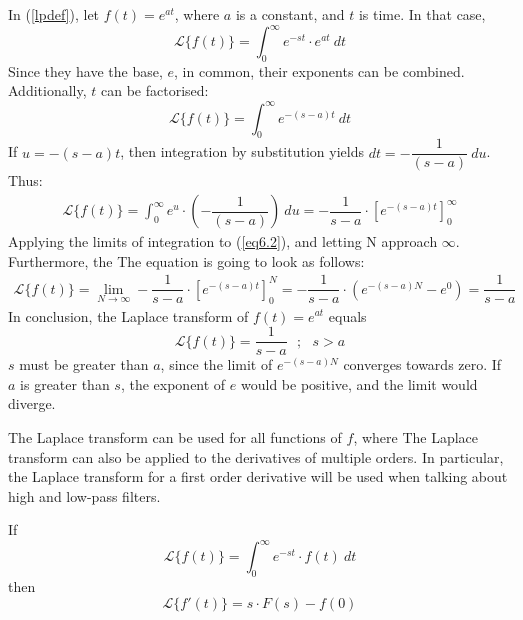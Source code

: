 \begin{tcolorbox}[colback=red!5!white,colframe=red!55!black,title=Example of a Laplace transform]
In (\ref{lpdef}), let $f(t)=e^{at}$, where $a$ is a constant, and $t$ is time. In that case,
$$\mathcal{L}\{f(t)\}=\int_{0}^{\infty} e^{-st}\cdot e^{at}\ dt$$
Since they have the base, $e$, in common, their exponents can be combined. Additionally, $t$ can be factorised:
$$\mathcal{L}\{f(t)\}=\int_{0}^{\infty} e^{-(s-a)t}\ dt$$
If $u=-(s-a)t$, then integration by substitution yields $dt=-\dfrac{1}{(s-a)}\ du$. Thus:
\begin{align}
\mathcal{L}\{f(t)\}=\int_{0}^{\infty} e^{u}\cdot (-\dfrac{1}{(s-a)})\ du =  -\dfrac{1}{s-a} \cdot \left[e^{-(s-a)t} \right]_{0}^{\infty}
\label{eq6.2}
\end{align}
Applying the limits of integration to (\ref{eq6.2}), and letting N approach $\infty$. Furthermore, the The equation is going to look as follows:
\begin{align*}
\mathcal{L}\{f(t)\} = \lim_{N \to \infty} -\dfrac{1}{s-a} \cdot \left[e^{-(s-a)t} \right]_{0}^{N} =-\dfrac{1}{s-a}\cdot (e^{-(s-a)N}-e^{0})=\dfrac{1}{s-a}
\end{align*}
In conclusion, the Laplace transform of $f(t)=e^{at}$ equals
$$\mathcal{L}\{f(t)\}=\dfrac{1}{s-a} \ \ \ ;\ \ \ s>a$$
$s$ must be greater than $a$, since the limit of $e^{-(s-a)N}$ converges towards zero. If $a$ is greater than $s$, the exponent of $e$ would be positive, and the limit would diverge. 
\end{tcolorbox}
The Laplace transform can be used for all functions of $f$, where 
The Laplace transform can also be applied to the derivatives of multiple orders. In particular, the Laplace transform for a first order derivative will be used when talking about high and low-pass filters. 
\begin{tcolorbox}[colback=green!5!white,colframe=green!40!black,title=Theorem 6.1: Laplace transform of a first order derivative]
If
$$\mathcal{L}\{f(t)\}=\int_{0}^{\infty} e^{-st}\cdot f(t)\ dt$$
then
$$\mathcal{L}\{f'(t)\} = s\cdot F(s)-f(0)$$
\end{tcolorbox}

